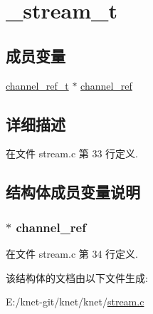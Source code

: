 \hypertarget{struct__stream__t}{}\section{\+\_\+stream\+\_\+t}
\label{struct__stream__t}
\subsection*{成员变量}
\begin{DoxyCompactItemize}
\item 
\hyperlink{config_8h_a151271c9d188ef28d4d24bb81dcc1263}{channel\+\_\+ref\+\_\+t} $\ast$ \hyperlink{struct__stream__t_ae824bc2e5f0851cf77fdfaf0804105f8}{channel\+\_\+ref}
\end{DoxyCompactItemize}


\subsection{详细描述}


在文件 stream.\+c 第 33 行定义.



\subsection{结构体成员变量说明}
\hypertarget{struct__stream__t_ae824bc2e5f0851cf77fdfaf0804105f8}{}
\subsubsection[{channel\+\_\+ref}]{$\ast$ channel\+\_\+ref}\label{struct__stream__t_ae824bc2e5f0851cf77fdfaf0804105f8}


在文件 stream.\+c 第 34 行定义.



该结构体的文档由以下文件生成\+:\begin{DoxyCompactItemize}
\item 
E\+:/knet-\/git/knet/knet/\hyperlink{stream_8c}{stream.\+c}\end{DoxyCompactItemize}
